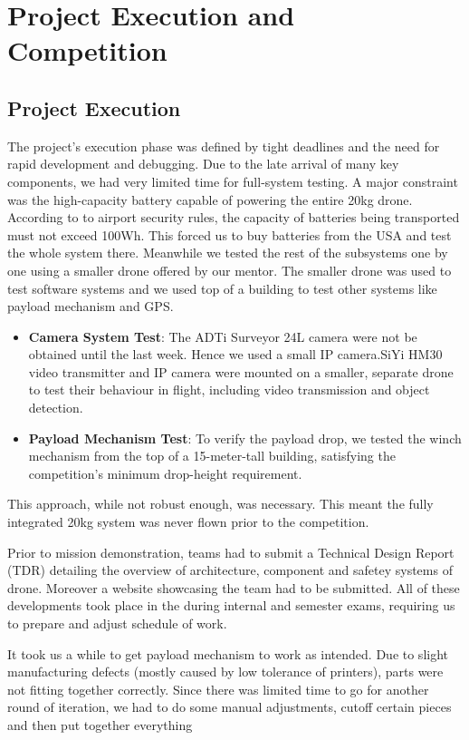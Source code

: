 
\chapter{Project Execution and Competition}
\section{Project Execution}

The project's execution phase was defined by tight deadlines and the need for rapid development and debugging. Due to the late arrival of many key components, we had very limited time for full-system testing. A major constraint was the high-capacity battery capable of powering the entire 20kg drone. According to to airport security rules, the capacity of batteries being transported must not exceed 100Wh. This forced us to buy batteries from the USA and test the whole system there. Meanwhile we tested the rest of the subsystems one by one using a smaller drone offered by our mentor. The smaller drone was used to test software systems and we used top of a building to test other systems like payload mechanism and GPS.
\begin{itemize}
	\item \textbf{Camera System Test}: The ADTi Surveyor 24L camera were not be obtained until the last week. Hence we used a small IP camera.SiYi HM30 video transmitter and IP camera were mounted on a smaller, separate drone to test their behaviour in flight, including video transmission and object detection.
	\item \textbf {Payload Mechanism Test}: To verify the payload drop, we tested the winch mechanism from the top of a 15-meter-tall building, satisfying the competition's minimum drop-height requirement.
\end{itemize}

This approach, while not robust enough, was necessary. This meant the fully integrated 20kg system was never flown prior to the competition.

Prior to mission demonstration, teams had to submit a Technical Design Report (TDR) detailing the overview of architecture, component and safetey systems of drone. Moreover a website showcasing the team had to be submitted. All of these developments took place in the during internal and semester exams, requiring us to prepare and adjust schedule of work.

It took us a while to get payload mechanism to work as intended.
Due to slight manufacturing defects (mostly caused by low tolerance of printers),
parts were not fitting together correctly. Since there was limited time to go for another round of iteration, we had to do some manual adjustments, cutoff certain pieces and then put together everything
